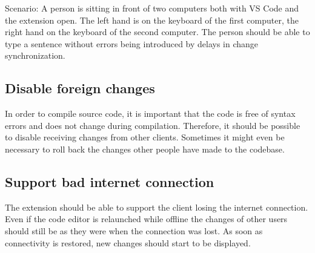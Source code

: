 Scenario: A person is sitting in front of two computers both with VS Code and the extension open. The left hand is on the keyboard of the first computer, the right hand on the keyboard of the second computer. The person should be able to type a sentence without errors being introduced by delays in change synchronization.

\subsection{Disable foreign changes}

In order to compile source code, it is important that the code is free of syntax errors and does not change during compilation. Therefore, it should be possible to disable receiving changes from other clients. Sometimes it might even be necessary to roll back the changes other people have made to the codebase.

\subsection{Support bad internet connection}

The extension should be able to support the client losing the internet connection. Even if the code editor is relaunched while offline the changes of other users should still be as they were when the connection was lost. As soon as connectivity is restored, new changes should start to be displayed. 